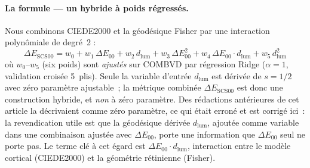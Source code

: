\documentclass[12pt,a4paper]{article}
\begin{document}
\paragraph{La formule --- un hybride \`a poids r\'egress\'es.}
Nous combinons CIEDE2000 et la g\'eod\'esique Fisher par une
interaction polyn\^omiale de degr\'e~2 :
\begin{equation}
  \Delta E_{\mathrm{SCS00}}
  = w_0 + w_1\,\Delta E_{00}
  + w_2\,d_{\mathrm{lum}}
  + w_3\,\Delta E_{00}^2
  + w_4\,\Delta E_{00}\cdot d_{\mathrm{lum}}
  + w_5\,d_{\mathrm{lum}}^2
  \label{eq:sct00}
\end{equation}
o\`u $w_0$--$w_5$ (six poids) sont \emph{ajust\'es} sur COMBVD par
r\'egression Ridge ($\alpha = 1$, validation crois\'ee 5~plis).
Seule la variable d'entr\'ee $d_{\mathrm{lum}}$ est d\'eriv\'ee de
$s = 1/2$ avec z\'ero param\`etre ajustable~; la m\'etrique
combin\'ee $\Delta E_{\mathrm{SCS00}}$ est donc une construction
hybride, et \emph{non} \`a z\'ero param\`etre. Des r\'edactions
ant\'erieures de cet article la d\'ecrivaient comme z\'ero
param\`etre, ce qui \'etait erron\'e et est corrig\'e ici~: la
revendication utile est que la g\'eod\'esique d\'eriv\'ee
$d_{\mathrm{lum}}$, ajout\'ee comme variable dans une combinaison
ajust\'ee avec $\Delta E_{00}$, porte une information que
$\Delta E_{00}$ seul ne porte pas. Le terme cl\'e \`a cet \'egard est
$\Delta E_{00} \cdot d_{\mathrm{lum}}$, interaction entre le mod\`ele
cortical (CIEDE2000) et la g\'eom\'etrie r\'etinienne (Fisher).
\end{document}
